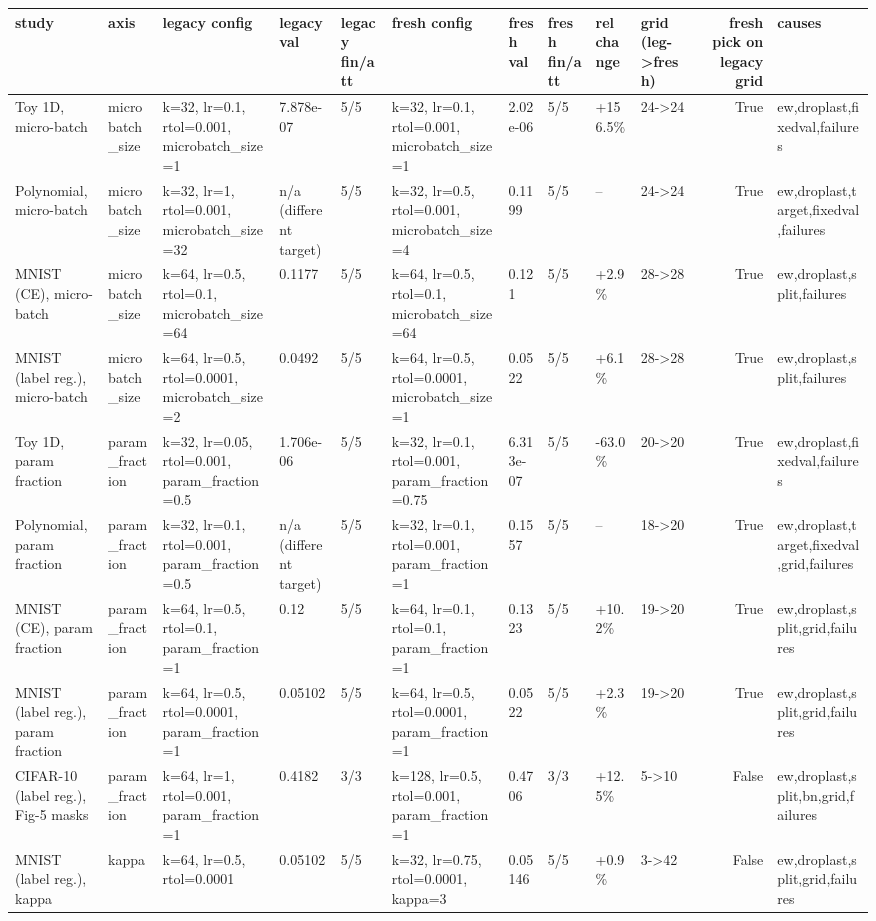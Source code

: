 \begin{tabular}{llllllllllrl}
\toprule
study & axis & legacy config & legacy val & legacy fin/att & fresh config & fresh val & fresh fin/att & rel change & grid (leg->fresh) & fresh pick on legacy grid & causes \\
\midrule
Toy 1D, micro-batch & microbatch\_size & k=32, lr=0.1, rtol=0.001, microbatch\_size=1 & 7.878e-07 & 5/5 & k=32, lr=0.1, rtol=0.001, microbatch\_size=1 & 2.02e-06 & 5/5 & +156.5\% & 24->24 & True & ew,droplast,fixedval,failures \\
Polynomial, micro-batch & microbatch\_size & k=32, lr=1, rtol=0.001, microbatch\_size=32 & n/a (different target) & 5/5 & k=32, lr=0.5, rtol=0.001, microbatch\_size=4 & 0.1199 & 5/5 & -- & 24->24 & True & ew,droplast,target,fixedval,failures \\
MNIST (CE), micro-batch & microbatch\_size & k=64, lr=0.5, rtol=0.1, microbatch\_size=64 & 0.1177 & 5/5 & k=64, lr=0.5, rtol=0.1, microbatch\_size=64 & 0.121 & 5/5 & +2.9\% & 28->28 & True & ew,droplast,split,failures \\
MNIST (label reg.), micro-batch & microbatch\_size & k=64, lr=0.5, rtol=0.0001, microbatch\_size=2 & 0.0492 & 5/5 & k=64, lr=0.5, rtol=0.0001, microbatch\_size=1 & 0.0522 & 5/5 & +6.1\% & 28->28 & True & ew,droplast,split,failures \\
Toy 1D, param fraction & param\_fraction & k=32, lr=0.05, rtol=0.001, param\_fraction=0.5 & 1.706e-06 & 5/5 & k=32, lr=0.1, rtol=0.001, param\_fraction=0.75 & 6.313e-07 & 5/5 & -63.0\% & 20->20 & True & ew,droplast,fixedval,failures \\
Polynomial, param fraction & param\_fraction & k=32, lr=0.1, rtol=0.001, param\_fraction=0.5 & n/a (different target) & 5/5 & k=32, lr=0.1, rtol=0.001, param\_fraction=1 & 0.1557 & 5/5 & -- & 18->20 & True & ew,droplast,target,fixedval,grid,failures \\
MNIST (CE), param fraction & param\_fraction & k=64, lr=0.5, rtol=0.1, param\_fraction=1 & 0.12 & 5/5 & k=64, lr=0.1, rtol=0.1, param\_fraction=1 & 0.1323 & 5/5 & +10.2\% & 19->20 & True & ew,droplast,split,grid,failures \\
MNIST (label reg.), param fraction & param\_fraction & k=64, lr=0.5, rtol=0.0001, param\_fraction=1 & 0.05102 & 5/5 & k=64, lr=0.5, rtol=0.0001, param\_fraction=1 & 0.0522 & 5/5 & +2.3\% & 19->20 & True & ew,droplast,split,grid,failures \\
CIFAR-10 (label reg.), Fig-5 masks & param\_fraction & k=64, lr=1, rtol=0.001, param\_fraction=1 & 0.4182 & 3/3 & k=128, lr=0.5, rtol=0.001, param\_fraction=1 & 0.4706 & 3/3 & +12.5\% & 5->10 & False & ew,droplast,split,bn,grid,failures \\
MNIST (label reg.), kappa & kappa & k=64, lr=0.5, rtol=0.0001 & 0.05102 & 5/5 & k=32, lr=0.75, rtol=0.0001, kappa=3 & 0.05146 & 5/5 & +0.9\% & 3->42 & False & ew,droplast,split,grid,failures \\
\bottomrule
\end{tabular}
